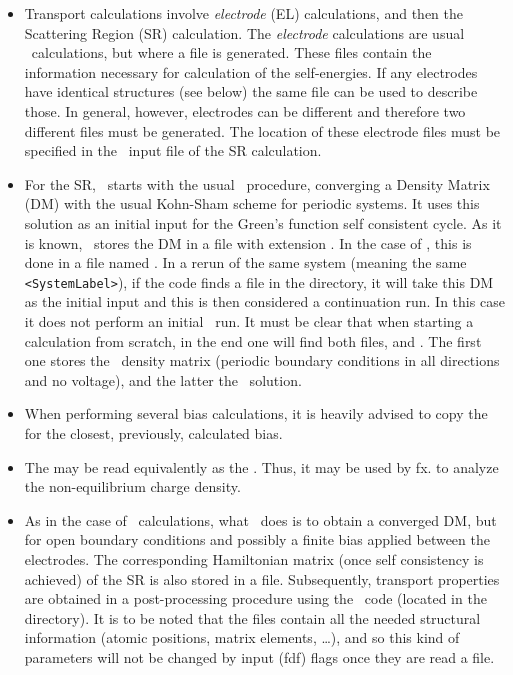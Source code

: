 \begin{itemize}
  \item%
  Transport calculations involve \emph{electrode} (EL) calculations,
  and then the Scattering Region (SR) calculation.  The
  \emph{electrode} calculations are usual \siesta\ calculations, but
  where a file  is generated. These files contain the
  information necessary for calculation of the self-energies. If any
  electrodes have identical structures (see below) the same
   file can be used to describe those. In general,
  however, electrodes can be different and therefore two different
   files must be generated. The location of these
  electrode files must be specified in the \fdflib\ input file of the SR
  calculation.

  \item %
  For the SR, \tsiesta\ starts with the usual \siesta\ procedure,
  converging a Density Matrix (DM) with the usual Kohn-Sham scheme for
  periodic systems. It uses this solution as an initial input for the
  Green's function self consistent cycle. As it is known, \siesta\
  stores the DM in a file with extension . In the case of
  \tsiesta, this is done in a file named . In a rerun of
  the same system (meaning the same \texttt{<SystemLabel>}), if the
  code finds a \sysfile{TSDE} file in the directory, it will take this
  DM as the initial input and this is then considered a continuation
  run. In this case it does not perform an initial \siesta\ run. It
  must be clear that when starting a calculation from scratch, in the
  end one will find both files, \sysfile{DM} and \sysfile{TSDE}.
  The first one stores the \siesta\ density matrix (periodic boundary
  conditions in all directions and no voltage), and the latter the
  \tsiesta\ solution. 

  \item %
  When performing several bias calculations, it is heavily advised to
  copy the \sysfile{TSDE} for the closest, previously, calculated
  bias.
  
  \item %
  The  may be read equivalently as the
  . Thus, it may be used by fx.  to
  analyze the non-equilibrium charge density.

  \item %
  As in the case of \siesta\ calculations, what \tsiesta\ does is to
  obtain a converged DM, but for open boundary conditions and possibly
  a finite bias applied between the electrodes. The corresponding
  Hamiltonian matrix (once self consistency is achieved) of the SR is
  also stored in a \sysfile{TSHS} file. Subsequently, transport
  properties are obtained in a post-processing procedure using the
  \tbtrans\ code (located in the \program{Util/TS/TBtrans}
  directory). It is to be noted that the  files contain
  all the needed structural information (atomic positions, matrix
  elements, \ldots), and so this kind of parameters will not be
  changed by input (fdf) flags once they are read a 
  file.


\end{itemize}
